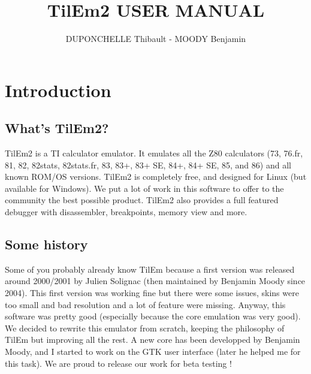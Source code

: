 \documentclass[10pt]{report}
\title {TilEm2 USER MANUAL}
\author {DUPONCHELLE Thibault - MOODY Benjamin}
\begin{document}
\maketitle

\tableofcontents

\chapter{Introduction}
\section{What's TilEm2?}
TilEm2 is a TI calculator emulator. It emulates all the Z80 calculators (73, 76.fr, 81, 82, 82stats, 82stats.fr, 83, 83+, 83+ SE, 84+, 84+ SE, 85, and 86) and all known ROM/OS versions.\newline
TilEm2 is completely free, and designed for Linux (but available for Windows).\newline
We put a lot of work in this software to offer to the community the best possible product.\newline
TilEm2 also provides a full featured debugger with disassembler, breakpoints, memory view and more.\newline


\section{Some history}
Some of you probably already know TilEm because a first version was released around 2000/2001 by Julien Solignac (then maintained by Benjamin Moody since 2004).\newline
This first version was working fine but there were some issues, skins were too small and bad resolution and a lot of feature were missing.\newline
Anyway, this software was pretty good (especially because the core emulation was very good).\newline
We decided to rewrite this emulator from scratch, keeping the philosophy of TilEm but improving all the rest.\newline
A new core has been developped by Benjamin Moody, and I started to work on the GTK user interface (later he helped me for this task).\newline\newline
We are proud to release our work for beta testing !
\end{document}
